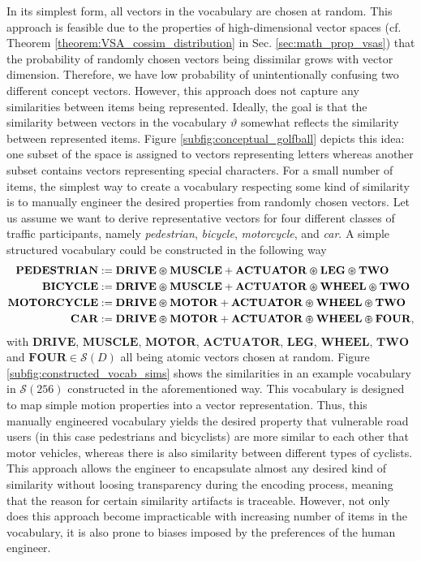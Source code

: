 In its simplest form, all vectors in the vocabulary are chosen at random.
This approach is feasible due to the properties of high-dimensional vector spaces (cf. Theorem \ref{theorem:VSA_cossim_distribution} in Sec. \ref{sec:math_prop_vsas}) that the probability of randomly chosen vectors being dissimilar grows with vector dimension.
Therefore,  we have low probability of unintentionally confusing two different concept vectors.
However, this approach does not capture any similarities between items being represented.
Ideally, the goal is that the similarity between vectors in the vocabulary $\vartheta$ somewhat reflects the similarity between represented items.
Figure \ref{subfig:conceptual_golfball} depicts this idea: one subset of the space is assigned to vectors representing letters whereas another subset contains vectors representing special characters.
For a small number of items, the simplest way to create a vocabulary respecting some kind of similarity is to manually engineer the desired properties from randomly chosen vectors.
Let us assume we want to derive representative vectors for four different classes of traffic participants, namely \emph{pedestrian}, \emph{bicycle}, \emph{motorcycle},  and \emph{car}.
A simple structured vocabulary could be constructed in the following way
\begin{align*}
\mathbf{PEDESTRIAN} &:= \mathbf{DRIVE} \varoast \mathbf{MUSCLE} + \mathbf{ACTUATOR} \varoast \mathbf{LEG} \varoast \mathbf{TWO} \\
\mathbf{BICYCLE} &:= \mathbf{DRIVE} \varoast \mathbf{MUSCLE} + \mathbf{ACTUATOR} \varoast \mathbf{WHEEL} \varoast \mathbf{TWO}\\
\mathbf{MOTORCYCLE} &:= \mathbf{DRIVE} \varoast \mathbf{MOTOR} + \mathbf{ACTUATOR} \varoast \mathbf{WHEEL} \varoast \mathbf{TWO}\\
\mathbf{CAR} &:= \mathbf{DRIVE} \varoast \mathbf{MOTOR} + \mathbf{ACTUATOR} \varoast \mathbf{WHEEL} \varoast \mathbf{FOUR},
\end{align*}
with $\mathbf{DRIVE}$, $\mathbf{MUSCLE}$, $\mathbf{MOTOR}$, $\mathbf{ACTUATOR}$, $\mathbf{LEG}$, $\mathbf{WHEEL}$, $\mathbf{TWO}$ and $\mathbf{FOUR} \in \mathcal{S}(D)$ all being atomic vectors chosen at random.
Figure \ref{subfig:constructed_vocab_sims} shows the similarities in an example vocabulary in $\mathcal{S}(256)$ constructed in the aforementioned way.
This vocabulary is designed to map simple motion properties into a vector representation.
Thus, this manually engineered vocabulary yields the desired property that vulnerable road users (in this case pedestrians and bicyclists) are more similar to each other that motor vehicles, whereas there is also similarity between different types of cyclists.
This approach allows the engineer to encapsulate almost any desired kind of similarity without loosing transparency during the encoding process, meaning that the reason for certain similarity artifacts is traceable.
However, not only does this approach become impracticable with increasing number of items in the vocabulary, it is also prone to biases imposed by the preferences of the human engineer.

